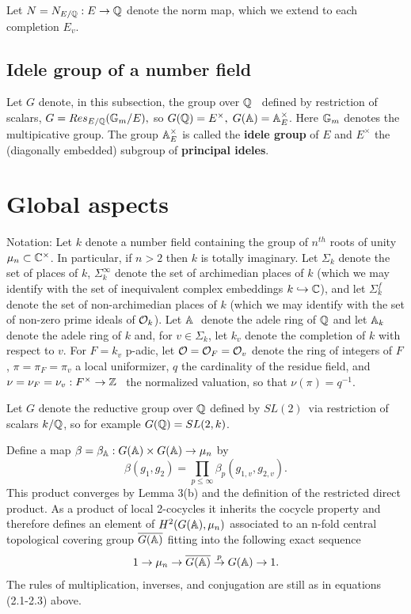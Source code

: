Let $N=N_{E/{\Bbb Q}}:E\rightarrow {\Bbb Q}$ denote the norm map, which we
extend to each completion $E_v$.

\subsection{Idele group of a number field}

Let $G$ denote, in this subsection, the group over ${\Bbb Q}$ \ defined by
restriction of scalars, $G=Res_{E/{\Bbb Q}}({\Bbb G}_m/E),$ so $G({\Bbb Q}%
)=E^{\times },\;G({\Bbb A})={\Bbb A}_E^{\times }$. Here ${\Bbb G}_m$ denotes
the multipicative group. The group ${\Bbb A}_E^{\times }$ is called the {\bf %
idele group} of $E$ and $E^{\times }$ the (diagonally embedded) subgroup of 
{\bf principal ideles}.

\section{Global aspects}

Notation: Let $k$ denote a number field containing the group of $n^{th}$
roots of unity $\mu _n\subset {\Bbb{C}}^{\times }$. In particular, if $n>2$
then $k$ is totally imaginary. Let $\Sigma _k$ denote the set of places of $k
$, $\Sigma _k^\infty $ denote the set of archimedian places of $k$ (which we
may identify with the set of inequivalent complex embeddings $k\hookrightarrow 
{\Bbb{C}}$), and let $\Sigma _k^f$ denote the set of non-archimedian places of 
$k$ (which we may identify with the set of non-zero prime ideals of $%
{\cal{O}}_k$). Let ${\Bbb{A}}$ $\;$denote the adele ring of ${\Bbb{Q}}$ and
let ${\Bbb{A}}_k$ denote the adele ring of $k$ and, for $v\in \Sigma _k$, let $%
k_v$ denote the completion of $k$ with respect to $v$. For $F=k_v$ p-adic,
let ${\cal{O}}={\cal{O}}_F={\cal{O}}_v$ denote the ring of integers of 
$F$, $\pi =\pi _F=\pi _v$ a local uniformizer, $q$ the cardinality of the
residue field, and $\nu =\nu _F=\nu _v:F^{\times }\rightarrow {\Bbb{Z}}$ \ the
normalized valuation, so that $\nu (\pi )=q^{-1}$.

Let $G$ denote the reductive group over ${\Bbb{Q}}$ defined by $SL(2)$\ via
restriction of scalars $k/{\Bbb{Q}}$, so for example $G({\Bbb{Q}})=SL(2,k)$.

Define a map $\beta =\beta _{{\Bbb{A}}}:G({\Bbb{A}})\times G({\Bbb{A}})\rightarrow
\mu _n$ by 
\[
\beta (g_1,g_2)=\prod_{p\leq \infty }\beta _p(g_{1,v},g_{2,v}).
\]
This product converges by Lemma 3(b) and the definition of the restricted
direct product. As a product of local 2-cocycles it inherits the cocycle
property and therefore defines an element of $H^2(G({\Bbb{A}}),\mu _n)$
associated to an n-fold central topological covering group $\overline{G(\Bbb{%
A})}$ fitting into the following exact sequence 
\begin{equation}
1\rightarrow \mu _n\rightarrow \overline{G({\Bbb{A}})}\stackrel{p}{\rightarrow 
}G({\Bbb{A}})\rightarrow 1.
\end{equation}
The rules of multiplication, inverses, and conjugation are still as in
equations (2.1-2.3) above.


